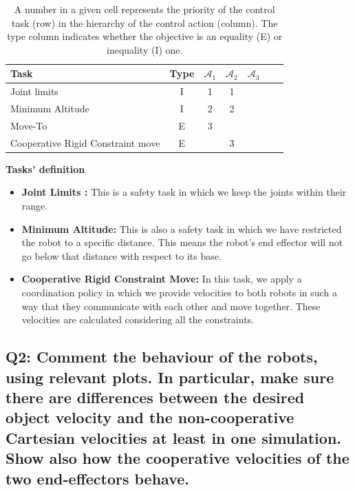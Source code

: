 \documentclass{article}
\begin{document}
\begin{table}[htb]
	\label {tbl:actions_tables}
	\begin{center}
		\footnotesize
		\begin{tabular}{lcccccc}
			\toprule		
			Task & Type & $\mathcal{A}_{1}$ & $\mathcal{A}_{2}$  & $\mathcal{A}_{3}$  \\
			\midrule
			Joint limits                      & I & 1 & 1 &  \\
			\hdashline
			Minimum Altitude						& I & 2& 2 & \\
			\hdashline 
			Move-To					& E &3 & & \\
			\hdashline 
			Cooperative Rigid Constraint move					& E & & 3 & \\
			
			\bottomrule
		\end{tabular}
	\end{center}
	\caption{A number in a given cell represents the priority of the control task (row) in the hierarchy of the control action (column). The type column indicates whether the objective is an equality (E) or inequality (I) one.}
\end{table}

\noindent
\textbf{Tasks' definition}
\begin{itemize}
	\item \textbf{Joint Limits :} This is a safety task in which we keep the joints within their range.
	\item \textbf{Minimum Altitude:} This is also a safety task in which we have restricted the robot to a specific distance. This means the robot's end effector will not go below that distance with respect to its base. 
	\item \textbf{Cooperative Rigid Constraint Move:} In this task, we apply a coordination policy in which we provide velocities to both robots in such a way that they communicate with each other and move together. These velocities are calculated considering all the constraints.
\end{itemize}
\subsection{Q2: Comment the behaviour of the robots, using relevant plots. In particular, make sure there are differences between the desired object velocity and the non-cooperative Cartesian velocities at least in one simulation. Show also how the cooperative velocities of the two end-effectors behave.}
\clearpage
\end{document}
